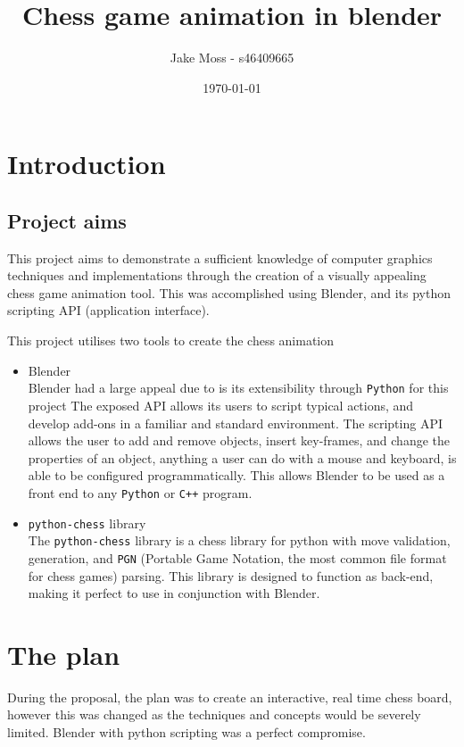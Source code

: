 \documentclass[11pt]{article}
\author{Jake Moss - s46409665}
\date{\today}
\title{Chess game animation in blender}
\begin{document}
\maketitle
\tableofcontents

\newpage

\section{Introduction}
\label{sec:orgab8d48e}
\subsection{Project aims}
\label{sec:orgf74af24}
This project aims to demonstrate a sufficient knowledge of computer graphics
techniques and implementations through the creation of a visually appealing
chess game animation tool. This was accomplished using Blender, and its python
scripting API (application interface).

This project utilises two tools to create the chess animation
\begin{itemize}
\item Blender\\
Blender had a large appeal due to is its extensibility through \texttt{Python} for
this project The exposed API allows its users to  script typical actions, and develop add-ons in a familiar
and standard environment. The scripting API allows the user to add
and remove objects, insert key-frames, and change the properties of an object,
anything a user can do with a mouse and keyboard, is able to be configured
programmatically. This allows Blender to be used as a front end to any \texttt{Python}
or \texttt{C++} program.
\item \texttt{python-chess} library\\
The \texttt{python-chess} library is a chess library for python with move validation,
generation, and \texttt{PGN} (Portable Game Notation, the most common file format
for chess games) parsing. This library is designed to function as
back-end, making it perfect to use in conjunction with Blender.
\end{itemize}
\section{The plan}
\label{sec:orged7e295}
During the proposal, the plan was to create an interactive, real time chess
board, however this was changed as the techniques and concepts would be severely
limited. Blender with python scripting was a perfect compromise.
\end{document}

